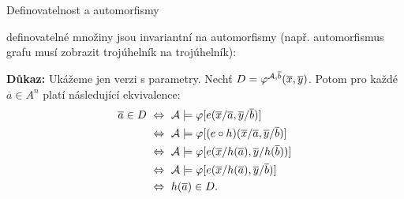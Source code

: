 \documentclass{beamer}
\begin{document}
\begin{frame}{Definovatelnost a automorfismy}

    definovatelné množiny jsou \alert{invariantní} na automorfismy (např. automorfismus grafu musí zobrazit trojúhelník na trojúhelník):

    \medskip


    \textbf{Důkaz:}
    Ukážeme jen verzi s parametry. Nechť $D=\varphi^{\mathcal{A},\overline{b}}(\overline{x},\overline{y})$. Potom pro každé $\overline{a}\in A^n$ platí následující ekvivalence:
    \begin{align*}
    \overline{a}\in D\ 
    &\Leftrightarrow\ \A\models \varphi[e(\overline{x}/\overline{a},\overline{y}/\overline{b})]\\
    &\Leftrightarrow\  \A\models \varphi[(e\circ h)(\overline{x}/\overline{a},\overline{y}/\overline{b})]\\
    &\Leftrightarrow\ \A\models \varphi[e(\overline{x}/h(\overline{a}),\overline{y}/h(\overline{b}))]\\
    &\Leftrightarrow\ \A\models \varphi[e(\overline{x}/h(\overline{a}),\overline{y}/\overline{b})]\\
    &\Leftrightarrow\ h(\overline{a})\in D.
    \end{align*}

    \vspace{-0.85cm}
    \hfill\qedsymbol    

\end{frame}
\end{document}
